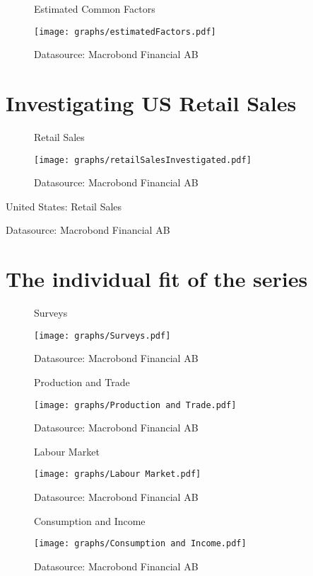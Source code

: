 \documentclass[12pt]{article}
\begin{document}
\begin{figure}[ht]
	\centering
	\caption{Estimated Common Factors}
	\texttt{[image: graphs/estimatedFactors.pdf]}
	\caption*{\small{Datasource: Macrobond Financial AB}}
\end{figure}
\FloatBarrier
\section{Investigating US Retail Sales}


\begin{figure}[ht]
	\centering
	\caption{Retail Sales}
	\texttt{[image: graphs/retailSalesInvestigated.pdf]}
	\caption*{\small{Datasource: Macrobond Financial AB}}
\end{figure}


\begin{table}[ht]
	\caption{United States: Retail Sales}
	
	\label{tab:tableRetail}
	\centering
	\caption*{\small{Datasource: Macrobond Financial AB}}
\end{table}

\FloatBarrier
\section{The individual fit of the series}



\begin{figure}[ht]
	\centering
	\caption{Surveys}
	\texttt{[image: graphs/Surveys.pdf]}
	\caption*{\small{Datasource: Macrobond Financial AB}}
\end{figure}



\begin{figure}[ht]
	\centering
	\caption{Production and Trade}
	\texttt{[image: graphs/Production and Trade.pdf]}
	\caption*{\small{Datasource: Macrobond Financial AB}}
\end{figure}


\begin{figure}[ht]
	\centering
	\caption{Labour Market}
	\texttt{[image: graphs/Labour Market.pdf]}
	\caption*{\small{Datasource: Macrobond Financial AB}}
\end{figure}


\begin{figure}[ht]
	\centering
	\caption{Consumption and Income}
	\texttt{[image: graphs/Consumption and Income.pdf]}
	\caption*{\small{Datasource: Macrobond Financial AB}}
\end{figure}
\end{document}
